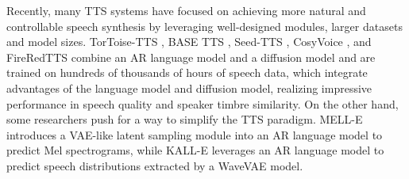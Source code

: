 Recently, many TTS systems have focused on achieving more natural and controllable speech synthesis by leveraging well-designed modules, larger datasets and model sizes. TorToise-TTS \cite{tortoisetts}, BASE TTS \cite{basetts}, Seed-TTS \cite{anastassiou2024seed}, CosyVoice \cite{du2024cosyvoice}, and FireRedTTS \cite{guo2024fireredtts} combine an AR language model and a diffusion model and are trained on hundreds of thousands of hours of speech data, which integrate advantages of the language model and diffusion model, realizing impressive performance in speech quality and speaker timbre similarity. On the other hand, some researchers push for a way to simplify the TTS paradigm. MELL-E \cite{melle} introduces a VAE-like latent sampling module into an AR language model to predict Mel spectrograms, while KALL-E \cite{kalle} leverages an AR language model to predict speech distributions extracted by a WaveVAE model.



